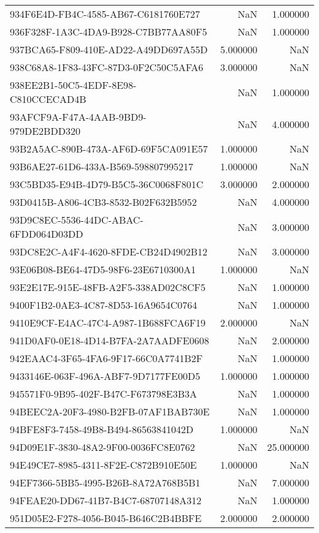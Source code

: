 \begin{tabular}{lrr}
934F6E4D-FB4C-4585-AB67-C6181760E727 & NaN & 1.000000 \\
936F328F-1A3C-4DA9-B928-C7BB77AA80F5 & NaN & 1.000000 \\
937BCA65-F809-410E-AD22-A49DD697A55D & 5.000000 & NaN \\
938C68A8-1F83-43FC-87D3-0F2C50C5AFA6 & 3.000000 & NaN \\
938EE2B1-50C5-4EDF-8E98-C810CCECAD4B & NaN & 1.000000 \\
93AFCF9A-F47A-4AAB-9BD9-979DE2BDD320 & NaN & 4.000000 \\
93B2A5AC-890B-473A-AF6D-69F5CA091E57 & 1.000000 & NaN \\
93B6AE27-61D6-433A-B569-598807995217 & 1.000000 & NaN \\
93C5BD35-E94B-4D79-B5C5-36C0068F801C & 3.000000 & 2.000000 \\
93D0415B-A806-4CB3-8532-B02F632B5952 & NaN & 4.000000 \\
93D9C8EC-5536-44DC-ABAC-6FDD064D03DD & NaN & 3.000000 \\
93DC8E2C-A4F4-4620-8FDE-CB24D4902B12 & NaN & 3.000000 \\
93E06B08-BE64-47D5-98F6-23E6710300A1 & 1.000000 & NaN \\
93E2E17E-915E-48FB-A2F5-338AD02C8CF5 & NaN & 1.000000 \\
9400F1B2-0AE3-4C87-8D53-16A9654C0764 & NaN & 1.000000 \\
9410E9CF-E4AC-47C4-A987-1B688FCA6F19 & 2.000000 & NaN \\
941D0AF0-0E18-4D14-B7FA-2A7AADFE0608 & NaN & 2.000000 \\
942EAAC4-3F65-4FA6-9F17-66C0A7741B2F & NaN & 1.000000 \\
9433146E-063F-496A-ABF7-9D7177FE00D5 & 1.000000 & 1.000000 \\
945571F0-9B95-402F-B47C-F673798E3B3A & NaN & 1.000000 \\
94BEEC2A-20F3-4980-B2FB-07AF1BAB730E & NaN & 1.000000 \\
94BFE8F3-7458-49B8-B494-86563841042D & 1.000000 & NaN \\
94D09E1F-3830-48A2-9F00-0036FC8E0762 & NaN & 25.000000 \\
94E49CE7-8985-4311-8F2E-C872B910E50E & 1.000000 & NaN \\
94EF7366-5BB5-4995-B26B-8A72A768B5B1 & NaN & 7.000000 \\
94FEAE20-DD67-41B7-B4C7-68707148A312 & NaN & 1.000000 \\
951D05E2-F278-4056-B045-B646C2B4BBFE & 2.000000 & 2.000000 \\

\end{tabular}
